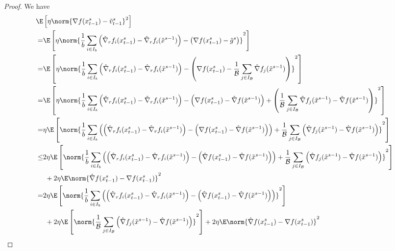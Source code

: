 \begin{proof}
We have
\begin{align}
  \E&\left[\eta\norm{\nabla f(x_{t-1}^s)-{\tilde{v}_{t-1}^s}}^2\right]\notag\\
   =&\E\left[\eta\norm{\frac{1}{b}\sum_{i\in I_b}\left(\hat{\nabla}_r f_i(x_{t-1}^s)-\hat{\nabla}_r f_i(\tilde{x}^{s-1})\right) - \left(\nabla f(x_{t-1}^s)-\hat{g}^s\right)}^2\right]\notag\\
   =&\E\left[\eta\norm{\frac{1}{b}\sum_{i\in I_b}\left(\hat{\nabla}_r f_i(x_{t-1}^s)-\hat{\nabla}_r f_i(\tilde{x}^{s-1})\right) - \left(\nabla f(x_{t-1}^s)-\frac{1}{\mathcal{B}}\sum_{j\in I_{\mathcal{B}}}\hat{\nabla} f_j(\tilde{x}^{s-1})\right)}^2\right]\notag\\
   =&\notag\E\left[\eta\norm{\frac{1}{b}\sum_{i\in I_b}\left(\hat{\nabla}_r f_i(x_{t-1}^s)-\hat{\nabla}_r f_i(\tilde{x}^{s-1})\right) - \left(\nabla f(x_{t-1}^s) - \hat{\nabla} f(\tilde{x}^{s-1}) \right)+ \left(\frac{1}{\mathcal{B}}\sum_{j\in I_{\mathcal{B}}}\hat{\nabla} f_j(\tilde{x}^{s-1}) - \hat{\nabla} f(\tilde{x}^{s-1})\right)}^2\right]\\
   =&\notag\eta\E\left[\norm{\frac{1}{b}\sum_{i\in I_b}\left(\left(\hat{\nabla}_r f_i(x_{t-1}^s)-\hat{\nabla}_r f_i(\tilde{x}^{s-1})\right) - \left(\nabla f(x_{t-1}^s) - \hat{\nabla} f(\tilde{x}^{s-1}) \right)\right)+ \frac{1}{\mathcal{B}}\sum_{j\in I_{\mathcal{B}}}\left(\hat{\nabla} f_j(\tilde{x}^{s-1}) - \hat{\nabla} f(\tilde{x}^{s-1})\right)}^2\right]\\
   \leq &\notag2\eta\E\left[\norm{\frac{1}{b}\sum_{i\in I_b}\left(\left(\hat{\nabla}_r f_i(x_{t-1}^s)-\hat{\nabla}_r f_i(\tilde{x}^{s-1})\right) - \left(\hat{\nabla} f(x_{t-1}^s) - \hat{\nabla} f(\tilde{x}^{s-1}) \right)\right)+ \frac{1}{\mathcal{B}}\sum_{j\in I_{\mathcal{B}}}\left(\hat{\nabla} f_j(\tilde{x}^{s-1}) - \hat{\nabla} f(\tilde{x}^{s-1})\right)}^2\right]\\
   &\,\, + 2\eta \E \norm{\hat{\nabla} f(x_{t-1}^s)-\nabla f(x_{t-1}^s)}^2\label{RandSGE-var-estimate-lem-1}\\
    = &\notag 2 \eta\E\left[\norm{\frac{1}{b}\sum_{i\in I_b}\left(\left(\hat{\nabla}_r f_i(x_{t-1}^s)-\hat{\nabla}_r f_i(\tilde{x}^{s-1})\right) - \left(\hat{\nabla} f(x_{t-1}^s) - \hat{\nabla} f(\tilde{x}^{s-1}) \right)\right)}^2\right]\\
   &\,\, +2 \eta \E \left[ \norm{\frac{1}{\mathcal{B}}\sum_{j\in I_{\mathcal{B}}}\left(\hat{\nabla} f_j(\tilde{x}^{s-1}) - \hat{\nabla} f(\tilde{x}^{s-1})\right)}^2\right]+ 2\eta \E \norm{\hat{\nabla} f(x_{t-1}^s)-\nabla f(x_{t-1}^s)}^2\label{RandSGE-var-estimate-lem-2}\\

\end{align}
\end{proof}
